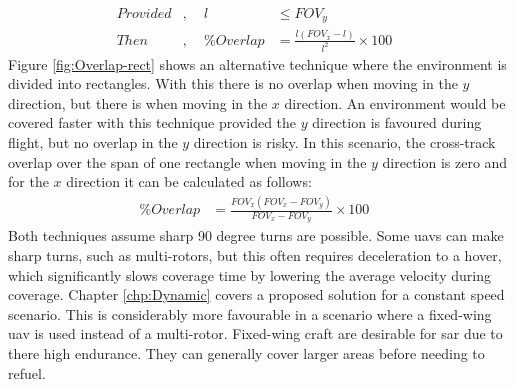 \begin{equation}
	\label{eqn:overlap_sqr}
	\begin{aligned}
		Provided&,& ~~l &\leq FOV_y& \\
		Then&,& ~~\%Overlap &= \frac{l(FOV_x - l)}{l^2} \times 100&
	\end{aligned}
\end{equation}
Figure \ref{fig:Overlap-rect} shows an alternative technique where the environment is divided into rectangles. With this there is no overlap when moving in the $y$ direction, but there is when moving in the $x$ direction. An environment would be covered faster with this technique provided the $y$ direction is favoured during flight, but no overlap in the $y$ direction is risky. In this scenario, the cross-track overlap over the span of one rectangle when moving in the $y$ direction is zero and for the $x$ direction it can be calculated as follows:
\begin{equation}
	\label{eqn:overlap_rect}
	\begin{aligned}
		\%Overlap &= \frac{FOV_x(FOV_x-FOV_y)}{FOV_x-FOV_y} \times 100&
	\end{aligned}
\end{equation}
Both techniques assume sharp 90 degree turns are possible. Some \acp{uav} can make sharp turns, such as multi-rotors, but this often requires deceleration to a hover, which significantly slows coverage time by lowering the average velocity during coverage. Chapter \ref{chp:Dynamic} covers a proposed solution for a constant speed scenario. This is considerably more favourable in a scenario where a fixed-wing \ac{uav} is used instead of a multi-rotor. Fixed-wing craft are desirable for \ac{sar} due to there high endurance. They can generally cover larger areas before needing to refuel.\\
